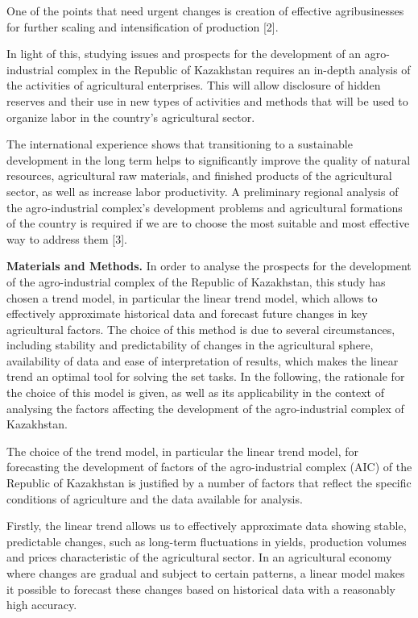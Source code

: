 \begin{multicols}{2}
One of the points that need urgent changes is creation of effective
agribusinesses for further scaling and intensification of production
{[}2{]}.

In light of this, studying issues and prospects for the development of
an agro-industrial complex in the Republic of Kazakhstan requires an
in-depth analysis of the activities of agricultural enterprises. This
will allow disclosure of hidden reserves and their use in new types of
activities and methods that will be used to organize labor in the
country's agricultural sector.

The international experience shows that transitioning to a sustainable
development in the long term helps to significantly improve the quality
of natural resources, agricultural raw materials, and finished products
of the agricultural sector, as well as increase labor productivity. A
preliminary regional analysis of the agro-industrial complex's
development problems and agricultural formations of the country is
required if we are to choose the most suitable and most effective way to
address them {[}3{]}.

{\bfseries Materials and Methods.} In order to analyse the prospects for
the development of the agro-industrial complex of the Republic of
Kazakhstan, this study has chosen a trend model, in particular the
linear trend model, which allows to effectively approximate historical
data and forecast future changes in key agricultural factors. The choice
of this method is due to several circumstances, including stability and
predictability of changes in the agricultural sphere, availability of
data and ease of interpretation of results, which makes the linear trend
an optimal tool for solving the set tasks. In the following, the
rationale for the choice of this model is given, as well as its
applicability in the context of analysing the factors affecting the
development of the agro-industrial complex of Kazakhstan.

The choice of the trend model, in particular the linear trend model, for
forecasting the development of factors of the agro-industrial complex
(AIC) of the Republic of Kazakhstan is justified by a number of factors
that reflect the specific conditions of agriculture and the data
available for analysis.

Firstly, the linear trend allows us to effectively approximate data
showing stable, predictable changes, such as long-term fluctuations in
yields, production volumes and prices characteristic of the agricultural
sector. In an agricultural economy where changes are gradual and subject
to certain patterns, a linear model makes it possible to forecast these
changes based on historical data with a reasonably high accuracy.


\end{multicols}
